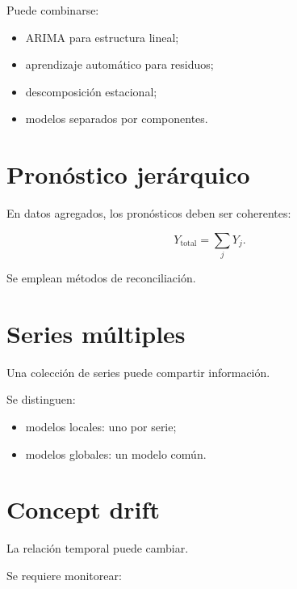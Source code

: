 \documentclass[
  spanish,
  10.5pt,
  letterpaper,
  DIV=11,
  numbers=noendperiod,
  oneside,
  open=any]{scrreprt}
\providecommand{\tightlist}{%
  \setlength{\itemsep}{0pt}\setlength{\parskip}{0pt}}
\theoremstyle{definition}
\theoremstyle{definition}
\theoremstyle{plain}
\theoremstyle{remark}
\begin{document}

Puede combinarse:

\begin{itemize}
\tightlist
\item
  ARIMA para estructura lineal;
\item
  aprendizaje automático para residuos;
\item
  descomposición estacional;
\item
  modelos separados por componentes.
\end{itemize}

\section*{Pronóstico jerárquico}\label{pronuxf3stico-jeruxe1rquico}


En datos agregados, los pronósticos deben ser coherentes:

\[
Y_{\text{total}}
=
\sum_jY_j.
\]

Se emplean métodos de reconciliación.

\section*{Series múltiples}\label{series-muxfaltiples}


Una colección de series puede compartir información.

Se distinguen:

\begin{itemize}
\tightlist
\item
  modelos locales: uno por serie;
\item
  modelos globales: un modelo común.
\end{itemize}

\section*{Concept drift}\label{concept-drift}


La relación temporal puede cambiar.

Se requiere monitorear:
\end{document}
